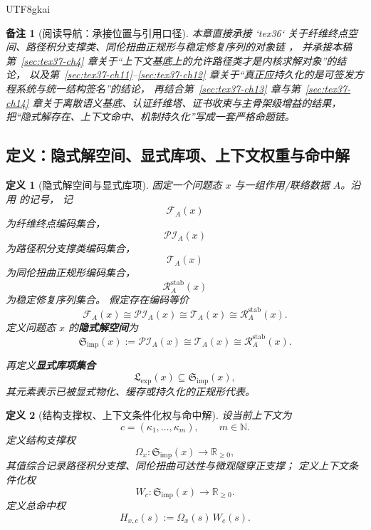 \documentclass[12pt]{article}
\newtheorem{definition}{定义}[section]
\newtheorem{remark}{备注}[section]
\newcommand{\NN}{\mathbb{N}}
\begin{document}
\begin{CJK*}{UTF8}{gkai}
\begin{remark}[阅读导航：承接位置与引用口径]
本章直接承接 `tex36` 关于纤维终点空间、路径积分支撑类、同伦扭曲正规形与稳定修复序列的对象链 \cite{RepoTex36HomotopyTwistBijection}，
并承接本稿第~\ref{sec:tex37-ch4} 章关于“上下文基底上的允许路径类才是内核求解对象”的结论，
以及第~\ref{sec:tex37-ch11}--\ref{sec:tex37-ch12} 章关于“真正应持久化的是可签发方程系统与统一结构签名”的结论，
再结合第~\ref{sec:tex37-ch13} 章与第~\ref{sec:tex37-ch14} 章关于离散语义基底、认证纤维塔、证书收束与主骨架级增益的结果，
把“隐式解存在、上下文命中、机制持久化”写成一套严格命题链。
\end{remark}

\subsection{定义：隐式解空间、显式库项、上下文权重与命中解}
\label{subsec:tex37-ch15-def}

\begin{definition}[隐式解空间与显式库项]
\label{def:tex37-ch15-implicit}
固定一个问题态 $x$ 与一组作用/联络数据 $A$。沿用 \cite{RepoTex36HomotopyTwistBijection} 的记号，
记
\[
  \mathcal F_A(x)
\]
为纤维终点编码集合，
\[
  \mathcal{PI}_A(x)
\]
为路径积分支撑类编码集合，
\[
  \mathcal T_A(x)
\]
为同伦扭曲正规形编码集合，
\[
  \mathcal R_A^{\mathrm{stab}}(x)
\]
为稳定修复序列集合。
假定存在编码等价
\[
  \mathcal F_A(x)
  \cong
  \mathcal{PI}_A(x)
  \cong
  \mathcal T_A(x)
  \cong
  \mathcal R_A^{\mathrm{stab}}(x).
\]
定义问题态 $x$ 的\textbf{隐式解空间}为
\[
  \mathfrak S_{\mathrm{imp}}(x)
  :=
  \mathcal{PI}_A(x)
  \cong
  \mathcal T_A(x)
  \cong
  \mathcal R_A^{\mathrm{stab}}(x).
\]

再定义\textbf{显式库项集合}
\[
  \mathfrak L_{\mathrm{exp}}(x)\subseteq \mathfrak S_{\mathrm{imp}}(x),
\]
其元素表示已被显式物化、缓存或持久化的正规形代表。
\end{definition}

\begin{definition}[结构支撑权、上下文条件化权与命中解]
\label{def:tex37-ch15-weight}
设当前上下文为
\[
  c=(\kappa_1,\dots,\kappa_m),
  \qquad
  m\in\NN.
\]
定义结构支撑权
\[
  \Omega_x:\mathfrak S_{\mathrm{imp}}(x)\to \mathbb R_{\ge 0},
\]
其值综合记录路径积分支撑、同伦扭曲可达性与微观隧穿正支撑；
定义上下文条件化权
\[
  W_c:\mathfrak S_{\mathrm{imp}}(x)\to \mathbb R_{\ge 0}.
\]
定义总命中权
\[
  H_{x,c}(s):=\Omega_x(s)\,W_c(s).
\]


\end{definition}
\end{CJK*}
\end{document}
